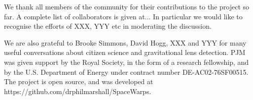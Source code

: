 We thank all \Ncollaboration members of the \sw community for their
contributions to the project so far. A complete list of collaborators is
given at... In particular we would like to recognise the efforts of XXX,
YYY etc in moderating the discussion.

We are also grateful to Brooke Simmons, David Hogg, XXX and YYY for many
useful conversations about citizen science and gravitational lens
detection. %
%
PJM was given support by the Royal  Society, in the form of a research
fellowship, and by the U.S.
Department of Energy under contract number DE-AC02-76SF00515.
%
%
%
%
The \sw project is open source, and was developed at
https://github.com/drphilmarshall/SpaceWarps.
